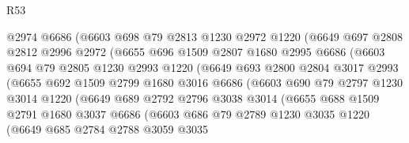 \begin{lexlean}{R53}
\begin{coremodule}
                  @2974
                  @6686
                  (@6603
                    @698
                    @79
                    @2813
                    @1230
                    @2972
                    @1220
                    (@6649
                      @697
                      @2808
                      @2812
                      @2996
                      @2972
                      (@6655
                        @696
                        @1509
                        @2807
                        @1680
                        @2995
                        @6686
                        (@6603
                          @694
                          @79
                          @2805
                          @1230
                          @2993
                          @1220
                          (@6649
                            @693
                            @2800
                            @2804
                            @3017
                            @2993
                            (@6655
                              @692
                              @1509
                              @2799
                              @1680
                              @3016
                              @6686
                              (@6603
                                @690
                                @79
                                @2797
                                @1230
                                @3014
                                @1220
                                (@6649
                                  @689
                                  @2792
                                  @2796
                                  @3038
                                  @3014
                                  (@6655
                                    @688
                                    @1509
                                    @2791
                                    @1680
                                    @3037
                                    @6686
                                    (@6603
                                      @686
                                      @79
                                      @2789
                                      @1230
                                      @3035
                                      @1220
                                      (@6649
                                        @685
                                        @2784
                                        @2788
                                        @3059
                                        @3035

\end{coremodule}
\end{lexlean}
